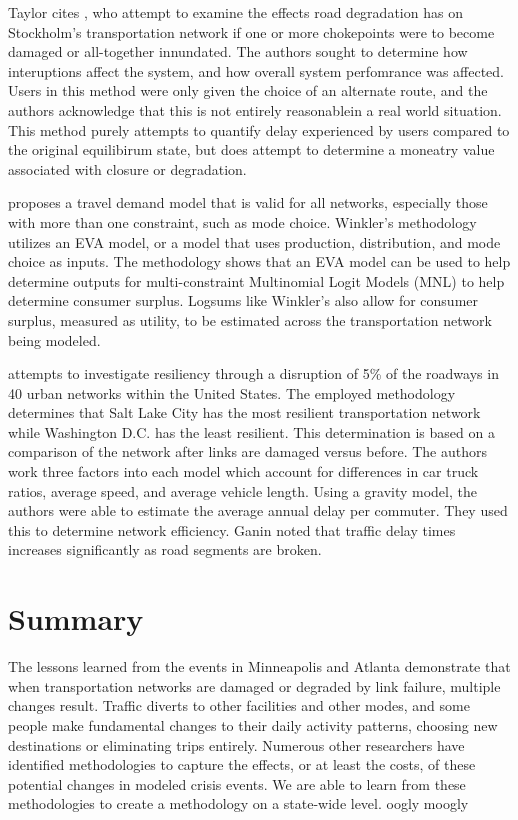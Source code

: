 Taylor cites \cite{Berdica2007}, who attempt to examine the effects road
degradation has on Stockholm's transportation network if one or more
chokepoints were to become damaged or all-together innundated. The authors
sought to determine how interuptions affect the system, and how overall
system perfomrance was affected. Users in this method were only given the
choice of an alternate route, and the authors acknowledge that this is not
entirely reasonablein a real world situation. This method purely attempts
to quantify delay experienced by users compared to the original
equilibirum state, but does attempt to determine a moneatry value
associated with closure or degradation.

\cite{winkler2016} proposes a travel demand model that is valid for all
networks,
especially those with more than one constraint, such as mode choice.
Winkler’s methodology
utilizes an EVA model, or a
model that uses production, distribution, and mode choice as inputs. The
methodology shows that
an EVA model can be used to help determine outputs for multi-constraint
Multinomial Logit Models
(MNL) to help determine consumer surplus. Logsums like Winkler’s also
allow for consumer surplus,
measured as utility, to be estimated across the transportation network
being modeled.

\cite{ganin2017} attempts to investigate resiliency through a disruption
of 5\% of the roadways
in 40 urban networks within the United States. The employed methodology
determines that Salt Lake
City has the most resilient transportation network while Washington D.C.
has the least resilient.
This determination is based on a comparison of the network after links are
damaged versus before.
The authors work three factors into each model which account for
differences in car
truck ratios, average speed, and average vehicle length. Using a gravity
model, the authors were
able to estimate the average
annual delay per commuter. They used this to determine network efficiency.
Ganin noted that
traffic delay times increases significantly as road segments are broken.

\section{Summary}

The lessons learned from the events in Minneapolis and Atlanta demonstrate
that when
transportation networks are damaged or degraded by link failure, multiple
changes result. Traffic
diverts to other facilities and other modes, and some people make
fundamental changes to their
daily activity patterns, choosing new destinations or eliminating trips
entirely. Numerous other
researchers have identified methodologies to capture the effects, or at
least the costs, of these
potential changes in modeled crisis events. We are able to learn from
these methodologies to
create a methodology on a state-wide level. oogly moogly
